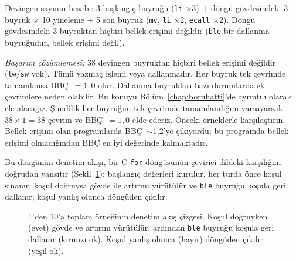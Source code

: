 \begin{ornek}[4.5]
Devingen sayının hesabı: 3 başlangıç buyruğu (\texttt{li} $\times 3$) + döngü gövdesindeki 3 buyruk $\times$ 10 yineleme + 5 son buyruk (\texttt{mv}, \texttt{li} $\times 2$, \texttt{ecall} $\times 2$). Döngü gövdesindeki 3 buyruktan hiçbiri bellek erişimi değildir (\texttt{ble} bir dallanma buyruğudur, bellek erişimi değil).

\emph{Başarım çözümlemesi:} 38 devingen buyruktan hiçbiri bellek erişimi değildir (\texttt{lw}/\texttt{sw} yok). Tümü yazmaç işlemi veya dallanmadır. Her buyruk tek çevrimde tamamlansa BBÇ~$= 1{,}0$ olur. Dallanma buyrukları bazı durumlarda ek çevrimlere neden olabilir. Bu konuyu Bölüm~\ref{chap:boruhatti}'de ayrıntılı olarak ele alacağız. Şimdilik her buyruğun tek çevrimde tamamlandığını varsayarsak $38 \times 1 = 38$ çevrim ve BBÇ~$= 1{,}0$ elde ederiz. Önceki örneklerle karşılaştırın. Bellek erişimi olan programlarda BBÇ~$\sim$1{,}2'ye çıkıyordu; bu programda bellek erişimi olmadığından BBÇ en iyi değerinde kalmaktadır.
\end{ornek}

Bu döngünün denetim akışı, bir C \texttt{for} döngüsünün çevirici dildeki karşılığını doğrudan yansıtır (Şekil~\ref{fig:dongu-akis}): başlangıç değerleri kurulur, her turda önce koşul sınanır, koşul doğruysa gövde ile artırım yürütülür ve \texttt{ble} buyruğu koşula geri dallanır; koşul yanlış olunca döngüden çıkılır.

\begin{figure}[htbp]
\centering
{}
\caption[C \texttt{for} döngüsünün denetim akışı]{1'den 10'a toplam örneğinin denetim akış çizgesi. Koşul doğruyken (evet) gövde ve artırım yürütülür, ardından \texttt{ble} buyruğu koşula geri dallanır (kırmızı ok). Koşul yanlış olunca (hayır) döngüden çıkılır (yeşil ok).}
\label{fig:dongu-akis}
\end{figure}

